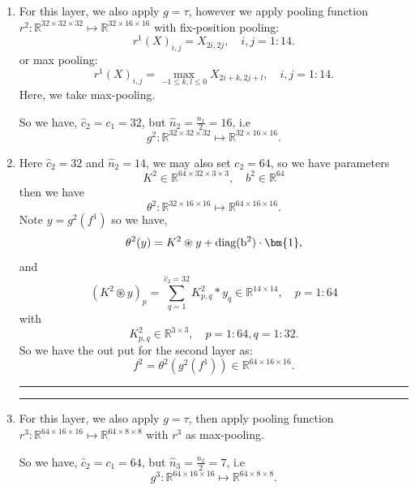 \begin{enumerate}
	\bigskip \hrule \bigskip  
	\bigskip \hrule \bigskip  
	\item For this layer, we also apply $g = \tau$, however we apply pooling function $r^2: \mathbb R^{32 \times 32 \times 32} \mapsto \mathbb R^{32 \times 16 \times16} $ with fix-position pooling:
	$$
	r^1(X)_{i,j} = X_{2i, 2j}, \quad  i, j = 1:14.
	$$ 
	or max pooling:
	$$
	r^1(X)_{i,j} = \max_{-1 \le k,l \le 0}X_{2i+k, 2j+l}, \quad i , j = 1:14.
	$$
	Here, we take max-pooling. 
	
	So we have, $\hat c_2 = c_1 = 32$, but $\hat n_2 = \frac{ n_1}{2} = 16$, i.e
	\begin{equation}
	g^2: \mathbb R^{32 \times 32 \times 32} \mapsto \mathbb R^{32\times 16 \times 16}.
	\end{equation}
	
	\item Here $\hat c_2 = 32$ and $\hat n_2 = 14$, we may also set $c_2 = 64$, so we have parameters 
	$$
	K^2 \in \mathbb R^{64 \times 32 \times 3 \times 3},\quad b^2 \in \mathbb R^{64}
	$$
	then we have 
	\begin{equation}
	\theta^2: \mathbb R^{32 \times 16 \times 16} \mapsto \mathbb R^{64 \times 16 \times 16}.
	\end{equation}
	Note $y = g^2 (f^1)$ so we have,
	\begin{equation}
	\theta^2(y) = K^2 \circledast y + {\rm{diag}(b^2)} \cdot \bm{1}, 
	\end{equation}
	and 
	\begin{equation}
	(K^2 \circledast y)_p = \sum_{q = 1}^{\hat c_2 = 32} K^2_{p,q} \ast y_q \in \mathbb R^{14 \times 14}, \quad p = 1:64
	\end{equation}
	with 
	$$
	K^2_{p,q} \in \mathbb R^{3 \times 3},\quad p = 1:64, q = 1:32.
	$$
	So we have the out put for the second layer as:
	\begin{equation}
	f^2 = \theta^2(g^2(f^1)) \in \mathbb R^{64 \times 16 \times 16}.
	\end{equation}
	
	
	
	\bigskip \hrule \bigskip  
	\bigskip \hrule \bigskip
	\item For this layer, we also apply $g = \tau$, then apply pooling function $r^3: \mathbb R^{64 \times 16\times 16} \mapsto \mathbb R^{64 \times 8 \times 8} $ with $r^3$ as max-pooling.
	
	So we have, $\hat c_2 = c_1 = 64$, but $\hat n_3 =  \frac{n_2}{2} = 7$, i.e
	\begin{equation}
	g^3: \mathbb R^{64 \times 16\times 16} \mapsto \mathbb R^{64 \times 8 \times 8}.
	\end{equation}
	

\end{enumerate}
